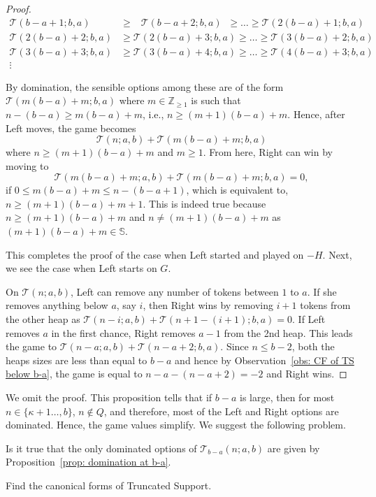 \documentclass[oneside,reqno]{amsart}
\newcommand{\ts}{\mathcal{T}}
\begin{document}
\begin{proof}
    \begin{align}
        \ts(b-a+1;b,a)&\ge \;\;\:\ts(b-a+2;b,a)\;\;\ge\dots\ge \ts(2(b-a)+1;b,a)\\
        \ts(2(b-a)+2;b,a)&\ge \ts(2(b-a)+3;b,a)\ge\dots\ge \ts(3(b-a)+2;b,a)\\
        \ts(3(b-a)+3;b,a)&\ge \ts(3(b-a)+4;b,a)\ge\dots\ge \ts(4(b-a)+3;b,a)\\
        \vdots\nonumber
    \end{align}

    By domination, the sensible options among these are of the form $\ts(m(b-a)+m;b,a)$ where $m\in \mathbb Z_{\ge 1}$ is such that $n-(b-a)\ge m(b-a)+m$, i.e., $n\ge (m+1)(b-a)+m$. Hence, after Left moves, the game becomes $$\ts(n;a,b)+\ts(m(b-a)+m;b,a)$$ where $n\ge (m+1)(b-a)+m$ and $m\ge 1$. From here, Right can win by moving to $$\ts(m(b-a)+m;a,b)+\ts(m(b-a)+m;b,a)=0,$$ if $0\le m(b-a)+m\le n-(b-a+1)$, which is equivalent to, $n\ge (m+1)(b-a)+m+1$. This is indeed true because $n\ge (m+1)(b-a)+m$ and $n\ne (m+1)(b-a)+m$ as $(m+1)(b-a)+m\in\mathbb S$.

    This completes the proof of the case when Left started and played on $-H$. Next, we see the case when Left starts on $G$.

    On $\ts(n;a,b)$, Left can remove any number of tokens between $1$ to $a$. If she removes anything below $a$, say $i$, then Right wins by removing $i+1$ tokens from the other heap as $\ts(n-i;a,b)+\ts(n+1-(i+1);b,a)=0$. If Left removes $a$ in the first chance, Right removes $a-1$ from the 2nd heap. This leads the game to $\ts(n-a;a,b)+\ts(n-a+2;b,a)$. Since $n\le b-2$, both the heaps sizes are less than equal to $b-a$ and hence by Observation~\ref{obs: CF of TS below b-a}, the game is equal to $n-a-(n-a+2)=-2$ and Right wins. 
\end{proof}
\fi 
We omit the proof. This proposition tells that if $b-a$ is large, then for most $n\in \{\kappa+1\dots,b\}$, $n\notin Q$, and therefore, most of the Left and Right options are dominated. Hence, the game values simplify. We suggest the following problem.%

\begin{problem}
    Is it true that the only dominated options of $\ts_{b-a}(n;a,b)$ are given by Proposition~\ref{prop: domination at b-a}.  
\end{problem}

\begin{problem}
    Find the canonical forms of {\sc Truncated Support}.
\end{problem}
\end{document}

